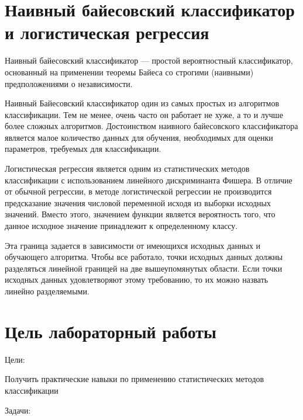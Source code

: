 \documentclass[a4paper,12pt]{article}
\begin{document}
\begin{titlepage}

\end{titlepage}

\newpage
\tableofcontents
\setcounter{page}{2}



\newpage\section{Наивный байесовский классификатор и логистическая регрессия} 
	Наивный байесовский классификатор — простой вероятностный классификатор, основанный на применении теоремы Байеса со строгими (наивными) предположениями о независимости.

	\vspace{0.5cm}
	Наивный Байесовский классификатор один из самых простых из алгоритмов классификации. Тем не менее, очень часто он работает не хуже, а то и лучше более сложных алгоритмов. Достоинством наивного байесовского классификатора является малое количество данных для обучения, необходимых для оценки параметров, требуемых для классификации.

	\vspace{0.5cm}
	Логистическая регрессия является одним из статистических методов классификации с использованием линейного дискриминанта Фишера. В отличие от обычной регрессии, в методе логистической регрессии не производится предсказание значения числовой переменной исходя из выборки исходных значений. Вместо этого, значением функции является вероятность того, что данное исходное значение принадлежит к определенному классу. 
	
	\vspace{0.5cm}
	Эта граница задается в зависимости от имеющихся исходных данных и обучающего алгоритма. Чтобы все работало, точки исходных данных должны разделяться линейной границей на две вышеупомянутых области. Если точки исходных данных удовлетворяют этому требованию, то их можно назвать линейно разделяемыми. 
	
	
	
\newpage\section{Цель лабораторный работы} 
	Цели: 
	\vspace{0.1cm}
	
	Получить практические навыки по применению статистических методов классификации
	
	\vspace{0.1cm}
	Задачи: 
	
\end{document}
